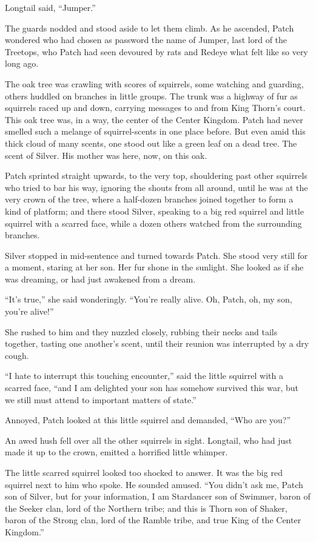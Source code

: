 \documentclass[12pt]{memoir}
\begin{document}
Longtail said, “Jumper.”

The guards nodded and stood aside to let them climb. As he ascended,
Patch wondered who had chosen as password the name of Jumper, last
lord of the Treetops, who Patch had seen devoured by rats and Redeye
what felt like so very long ago.

The oak tree was crawling with scores of squirrels, some watching and
guarding, others huddled on branches in little groups. The trunk was a
highway of fur as squirrels raced up and down, carrying messages to
and from King Thorn’s court. This oak tree was, in a way, the center
of the Center Kingdom. Patch had never smelled such a melange of
squirrel-scents in one place before. But even amid this thick cloud of
many scents, one stood out like a green leaf on a dead tree. The scent
of Silver. His mother was here, now, on this oak.

Patch sprinted straight upwards, to the very top, shouldering past
other squirrels who tried to bar his way, ignoring the shouts from all
around, until he was at the very crown of the tree, where a half-dozen
branches joined together to form a kind of platform; and there stood
Silver, speaking to a big red squirrel and little squirrel with a
scarred face, while a dozen others watched from the surrounding
branches.

Silver stopped in mid-sentence and turned towards Patch. She stood
very still for a moment, staring at her son. Her fur shone in the
sunlight. She looked as if she was dreaming, or had just awakened from
a dream.

“It’s true,” she said wonderingly. “You’re really alive. Oh, Patch,
oh, my son, you’re alive!”

She rushed to him and they nuzzled closely, rubbing their necks and
tails together, tasting one another’s scent, until their reunion was
interrupted by a dry cough.

“I hate to interrupt this touching encounter,” said the little
squirrel with a scarred face, “and I am delighted your son has somehow
survived this war, but we still must attend to important matters of
state.”

Annoyed, Patch looked at this little squirrel and demanded, “Who are
you?”

An awed hush fell over all the other squirrels in sight. Longtail, who
had just made it up to the crown, emitted a horrified little whimper.

The little scarred squirrel looked too shocked to answer. It was the
big red squirrel next to him who spoke. He sounded amused. “You didn’t
ask me, Patch son of Silver, but for your information, I am Stardancer
son of Swimmer, baron of the Seeker clan, lord of the Northern tribe;
and this is Thorn son of Shaker, baron of the Strong clan, lord of the
Ramble tribe, and true King of the Center Kingdom.”
\end{document}

